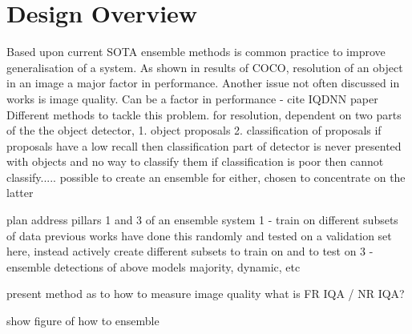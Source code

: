\section{Design Overview}
Based upon current SOTA ensemble methods is common practice to improve generalisation of a system.
As shown in results of COCO, resolution of an object in an image a major factor in performance.
Another issue not often discussed in works is image quality. Can be a factor in performance - cite IQDNN paper
Different methods to tackle this problem. 
for resolution, dependent on two parts of the the object detector, 1. object proposals 2. classification of proposals
	if proposals have a low recall then classification part of detector is never presented with objects and no way to classify them
	if classification is poor then cannot classify.....
possible to create an ensemble for either, chosen to concentrate on the latter

plan
address pillars 1 and 3 of an ensemble system
1 - train on different subsets of data
previous works have done this randomly and tested on a validation set
here, instead actively create different subsets to train on and to test on
3 - ensemble detections of above models
majority, dynamic, etc

present method as to how to measure image quality
what is FR IQA / NR IQA?

show figure of how to ensemble